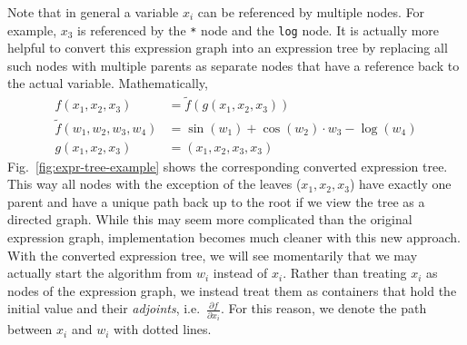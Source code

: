 Note that in general a variable $x_i$ can be referenced by multiple nodes.
For example, $x_3$ is referenced by the \verb|*| node and the \verb|log| node.
It is actually more helpful to convert this expression graph into an expression tree
by replacing all such nodes with multiple parents as separate nodes
that have a reference back to the actual variable.
Mathematically,
\begin{align}
    f(x_1, x_2, x_3) &= \tilde{f}(g(x_1, x_2, x_3)) \label{eq:f-tree-example} \\
    \tilde{f}(w_1, w_2, w_3, w_4) &= \sin(w_1) + \cos(w_2) \cdot w_3 - \log(w_4) \nonumber \\
    g(x_1, x_2, x_3) &= (x_1, x_2, x_3, x_3) \nonumber
\end{align}
Fig.~\ref{fig:expr-tree-example} shows the corresponding converted expression tree.
This way all nodes with the exception of the leaves ($x_1,x_2,x_3$) have exactly one parent
and have a unique path back up to the root if we view the tree as a directed graph.
While this may seem more complicated than the original expression graph,
implementation becomes much cleaner with this new approach.
With the converted expression tree, we will see momentarily that 
we may actually start the algorithm from $w_i$ instead of $x_i$.
Rather than treating $x_i$ as nodes of the expression graph,
we instead treat them as containers that hold the initial value and their \emph{adjoints}, 
i.e.\ $\frac{\partial f}{\partial x_i}$.
For this reason, we denote the path between $x_i$ and $w_i$ with dotted lines.


